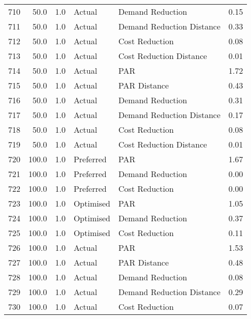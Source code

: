 \begin{longtable}{lrrllr}
710  &         50.0 &     1.0 &         Actual &           Demand Reduction &   0.15 \\
711  &         50.0 &     1.0 &         Actual &  Demand Reduction Distance &   0.33 \\
712  &         50.0 &     1.0 &         Actual &             Cost Reduction &   0.08 \\
713  &         50.0 &     1.0 &         Actual &    Cost Reduction Distance &   0.01 \\
714  &         50.0 &     1.0 &         Actual &                        PAR &   1.72 \\
715  &         50.0 &     1.0 &         Actual &               PAR Distance &   0.43 \\
716  &         50.0 &     1.0 &         Actual &           Demand Reduction &   0.31 \\
717  &         50.0 &     1.0 &         Actual &  Demand Reduction Distance &   0.17 \\
718  &         50.0 &     1.0 &         Actual &             Cost Reduction &   0.08 \\
719  &         50.0 &     1.0 &         Actual &    Cost Reduction Distance &   0.01 \\
720  &        100.0 &     1.0 &      Preferred &                        PAR &   1.67 \\
721  &        100.0 &     1.0 &      Preferred &           Demand Reduction &   0.00 \\
722  &        100.0 &     1.0 &      Preferred &             Cost Reduction &   0.00 \\
723  &        100.0 &     1.0 &      Optimised &                        PAR &   1.05 \\
724  &        100.0 &     1.0 &      Optimised &           Demand Reduction &   0.37 \\
725  &        100.0 &     1.0 &      Optimised &             Cost Reduction &   0.11 \\
726  &        100.0 &     1.0 &         Actual &                        PAR &   1.53 \\
727  &        100.0 &     1.0 &         Actual &               PAR Distance &   0.48 \\
728  &        100.0 &     1.0 &         Actual &           Demand Reduction &   0.08 \\
729  &        100.0 &     1.0 &         Actual &  Demand Reduction Distance &   0.29 \\
730  &        100.0 &     1.0 &         Actual &             Cost Reduction &   0.07 \\

\end{longtable}
